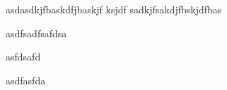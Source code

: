 \documentclass[a4paper, 12pt]{article}
\begin{document}
asdasdkjfbaskdfjbaskjf ksjdf sadkjfsakdjfbskjdfbas

asdfsadfsafdsa

asfdsafd

asdfasfda




\end{document}
